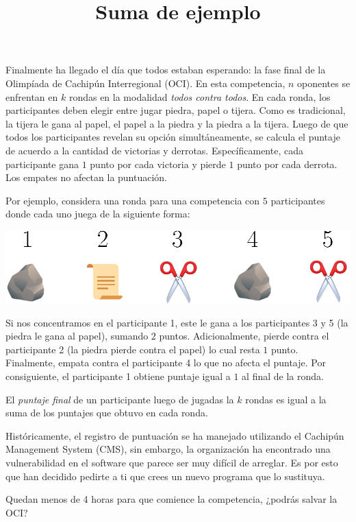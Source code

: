 \documentclass{oci}
\title{Suma de ejemplo}
\begin{document}
\begin{problemDescription}
  Finalmente ha llegado el día que todos estaban esperando:
  la fase final de la Olimpíada de Cachipún Interregional (OCI).
  En esta competencia, $n$ oponentes se enfrentan en $k$ rondas
  en la modalidad \emph{todos contra todos}.
  En cada ronda, los participantes deben elegir entre jugar piedra, papel o tijera.
  Como es tradicional, la tijera le gana al papel, el papel a la piedra y la piedra a
  la tijera.
  Luego de que todos los participantes revelan su opción simultáneamente, se
  calcula el puntaje de acuerdo a la cantidad de victorias y derrotas.
  Específicamente, cada participante gana $1$ punto por cada victoria
  y pierde $1$ punto por cada derrota.
  Los empates no afectan la puntuación.

  Por ejemplo, considera una ronda para una competencia con $5$ participantes donde
  cada uno juega de la siguiente forma:
  \begin{center}
    \includegraphics[scale=0.8]{ronda.eps}
  \end{center}
  Si nos concentramos en el participante 1, este le gana a los participantes 3 y 5
  (la piedra le gana al papel), sumando $2$ puntos.
  Adicionalmente, pierde contra el participante 2 (la piedra pierde contra el papel)
  lo cual resta $1$ punto.
  Finalmente, empata contra el participante 4 lo que no afecta el puntaje.
  Por consiguiente, el participante 1 obtiene puntaje igual a $1$ al final de la ronda.

  El \emph{puntaje final} de un participante luego de jugadas la $k$ rondas
  es igual a la suma de los puntajes que obtuvo en cada ronda.

  Históricamente, el registro de puntuación se ha manejado utilizando el
  Cachipún Management System (CMS), sin embargo, la organización ha encontrado
  una vulnerabilidad en el software que parece ser muy difícil de arreglar.
  Es por esto que han decidido pedirte a ti que crees un nuevo programa que lo
  sustituya.

  Quedan menos de 4 horas para que comience la competencia, ¿podrás salvar la OCI?
\end{problemDescription}
\end{document}
